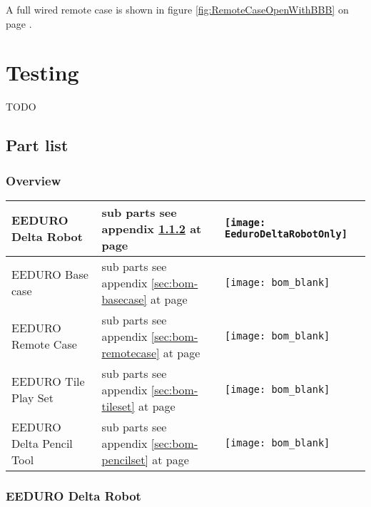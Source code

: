 A full wired remote case is shown in figure \ref{fig:RemoteCaseOpenWithBBB} on page \pageref{fig:RemoteCaseOpenWithBBB}.

\chapter{Testing}
TODO

\appendix
\addchap{\appendixname}
\makeatletter
\makeatother{}
\renewcommand{\thetable}{\Alph{section}.\arabic{table}}
\renewcommand{\thesection}{\Alph{section}}

\section{Part list}
\label{sec:bom}

\subsection{Overview}

\begin{tabular}{m{5cm} m{7cm} m{2cm}}
\hline
EEDURO Delta Robot          & sub parts see appendix \ref{sec:bom-robot} at page \pageref{sec:bom-robot}           & \texttt{[image: EeduroDeltaRobotOnly]} \\
\hline
EEDURO Base case            & sub parts see appendix \ref{sec:bom-basecase} at page \pageref{sec:bom-basecase}     & \texttt{[image: bom\_blank]}            \\
\hline
EEDURO Remote Case          & sub parts see appendix \ref{sec:bom-remotecase} at page \pageref{sec:bom-remotecase} & \texttt{[image: bom\_blank]}            \\
\hline
EEDURO Tile Play Set        & sub parts see appendix \ref{sec:bom-tileset} at page \pageref{sec:bom-tileset}       & \texttt{[image: bom\_blank]}            \\
\hline
EEDURO Delta Pencil Tool    & sub parts see appendix \ref{sec:bom-pencilset} at page \pageref{sec:bom-pencilset}   & \texttt{[image: bom\_blank]}            \\
\hline
\end{tabular}

\subsection{EEDURO Delta Robot}
\label{sec:bom-robot}

